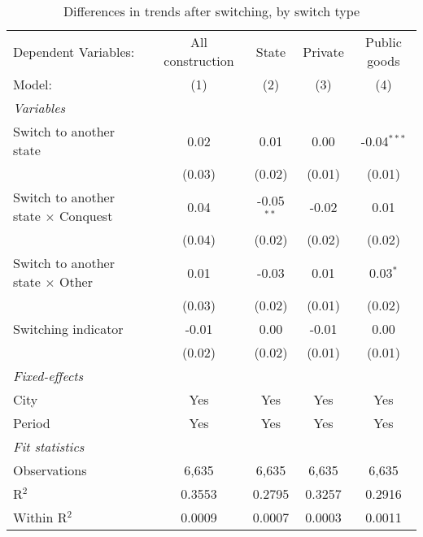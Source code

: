 \begin{table}[htbp]
   \caption{\label{tab:baseline_50y} Differences in trends after switching, by switch type}
   \centering
   \begin{tabular}{lcccc}
      \tabularnewline \midrule \midrule
      Dependent Variables:                       & All construction & State        & Private & Public goods\\  
      Model:                                     & (1)              & (2)          & (3)     & (4)\\  
      \midrule
      \emph{Variables}\\
      Switch to another state                    & 0.02             & 0.01         & 0.00    & -0.04$^{***}$\\   
                                                 & (0.03)           & (0.02)       & (0.01)  & (0.01)\\   
      Switch to another state $\times$ Conquest  & 0.04             & -0.05$^{**}$ & -0.02   & 0.01\\   
                                                 & (0.04)           & (0.02)       & (0.02)  & (0.02)\\   
      Switch to another state $\times$ Other     & 0.01             & -0.03        & 0.01    & 0.03$^{*}$\\   
                                                 & (0.03)           & (0.02)       & (0.01)  & (0.02)\\   
      Switching indicator                        & -0.01            & 0.00         & -0.01   & 0.00\\   
                                                 & (0.02)           & (0.02)       & (0.01)  & (0.01)\\   
      \midrule
      \emph{Fixed-effects}\\
      City                                       & Yes              & Yes          & Yes     & Yes\\  
      Period                                     & Yes              & Yes          & Yes     & Yes\\  
      \midrule
      \emph{Fit statistics}\\
      Observations                               & 6,635            & 6,635        & 6,635   & 6,635\\  
      R$^2$                                      & 0.3553           & 0.2795       & 0.3257  & 0.2916\\  
      Within R$^2$                               & 0.0009           & 0.0007       & 0.0003  & 0.0011\\  
      \midrule \midrule
      

\end{tabular}
\end{table}
